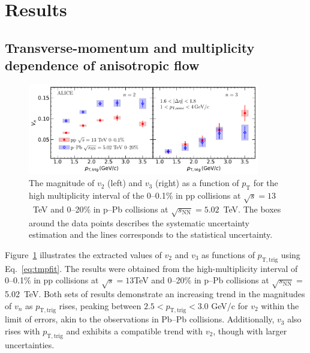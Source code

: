 
\section {Results}
\label{sec:results}
\subsection{Transverse-momentum and multiplicity dependence of anisotropic flow}

\begin{figure}[!b]
	\centering
	\hspace{-3em}\includegraphics[width=0.9\textwidth]{figures/FIG4_vn_pppPb.pdf} %
	\caption{The magnitude of $v_2$ (left) and $v_3$ (right) as a function of $p_\mathrm{T}$ for the high multiplicity interval of the 0--0.1\% in pp collisions at $\sqrt{s}=13$~TeV and 0--20\% in p--Pb collisions at $\sqrt{s_\mathrm{NN}} = 5.02$~TeV. The boxes around the data points describes the systematic uncertainty estimation and the lines corresponds to the statistical uncertainty.}
	\label{fig:vn}
\end{figure}
Figure~\ref{fig:vn} illustrates the extracted values of $v_2$ and $v_3$ as functions of $p_{\mathrm{T,trig}}$ using Eq.~\ref{eq:tmpfit}. The results were obtained from the high-multiplicity interval of 0--0.1\% in pp collisions at $\sqrt{s}=13$TeV and 0--20\% in p--Pb collisions at $\sqrt{s_\mathrm{NN}}=$5.02~TeV. Both sets of results demonstrate an increasing trend in the magnitudes of $v_n$ as $p_{\mathrm{T,trig}}$ rises, peaking between $2.5<p_{\mathrm{T,trig}}<3.0$ GeV/c for $v_2$ within the limit of errors, akin to the observations in Pb--Pb collisions\cite{Abelev:2012di, ALICE:2018yph}. Additionally, $v_3$ also rises with $p_{\mathrm{T,trig}}$ and exhibits a compatible trend with $v_2$, though with larger uncertainties.
